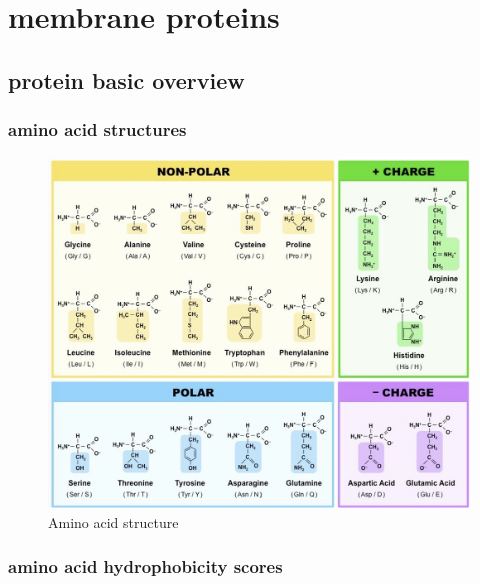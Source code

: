\documentclass[../main.tex]{subfiles}
\begin{document}
\section{membrane proteins}
\subsection{protein basic overview}
\subsubsection{amino acid structures}
\begin{figure}[H]
    \centering
    \includegraphics[width=\linewidth]{AA_structure.png}
    \caption{Amino acid structure}
    \label{fig:AA_struc}
\end{figure}

\subsubsection{amino acid hydrophobicity scores}
\end{document}
